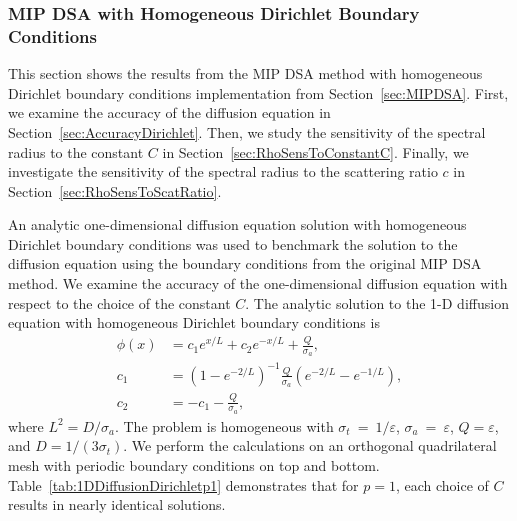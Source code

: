 \documentclass[12pt,letterpaper]{article}
\begin{document}
\subsubsection{MIP DSA with Homogeneous Dirichlet Boundary Conditions}
\label{sec:MIPDSADirichlet}
This section shows the results from the MIP DSA method with homogeneous Dirichlet boundary conditions implementation from Section~\ref{sec:MIPDSA}. First, we examine the accuracy of the diffusion equation in Section~\ref{sec:AccuracyDirichlet}. Then, we study the sensitivity of the spectral radius to the constant $C$ in Section~\ref{sec:RhoSensToConstantC}. Finally, we investigate the sensitivity of the spectral radius to the scattering ratio $c$ in Section~\ref{sec:RhoSensToScatRatio}.

\label{sec:AccuracyDirichlet}
An analytic one-dimensional diffusion equation solution with homogeneous Dirichlet boundary conditions was used to benchmark the solution to the diffusion equation using the boundary conditions from the original MIP DSA method. We examine the accuracy of the one-dimensional diffusion equation with respect to the choice of the constant $C$. The analytic solution to the 1-D diffusion equation with homogeneous Dirichlet boundary conditions is
\begin{subequations}
\begin{flalign}
\phi \left(x \right) & = c_1 e^{x/L} + c_2 e^{-x/L} + \frac{Q}{\sigma_a}, \\
c_1 & = \left(1-e^{-2/L} \right)^{-1} \frac{Q}{\sigma_a} \left(e^{-2/L}-e^{-1/L} \right), \\
c_2 & = -c_1 - \frac{Q}{\sigma_a},
\end{flalign}
\end{subequations}
%
\noindent where $L^2 = D/\sigma_a$. The problem is homogeneous with $\sigma_t~=~1/\varepsilon$, $\sigma_a~=~\varepsilon$, $Q=\varepsilon$, and $D=1/(3 \sigma_t)$. We perform the calculations on an orthogonal quadrilateral mesh with periodic boundary conditions on top and bottom. Table~\ref{tab:1DDiffusionDirichletp1} demonstrates that for $p=1$, each choice of $C$ results in nearly identical solutions.
%
\end{document}
